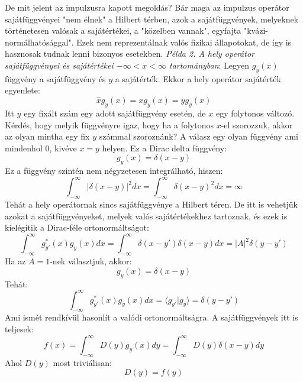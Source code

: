 \documentclass[../main.tex]{subfiles}
\begin{document}
De mit jelent az impulzusra kapott megoldás? Bár maga az impulzus operátor sajátfüggvényei "nem élnek" a Hilbert térben, azok a sajátfüggvények, melyeknek történetesen valósak a sajátértékei, 
a "közelben vannak", egyfajta "kvázi-normálhatósággal". Ezek nem reprezentálnak valós fizikai állapotokat, de így is hasznosak tudnak lenni bizonyos esetekben.
\newline
\newline
\textit{Példa 2. A hely operátor sajátfüggvényei és sajátértékei $-\infty < x < \infty$ tartományban}:
\newline
\newline
Legyen $g_{y}(x)$ függvény a sajátfüggvény és $y$ a sajátérték. Ekkor a hely operátor sajátérték egyenlete:
\begin{equation}
    \hat{x} g_{y}(x) = x g_{y}(x) = y g_{y}(x)
\end{equation}
Itt $y$ egy fixált szám egy adott sajátfüggvény esetén, de $x$ egy folytonos változó. Kérdés, hogy melyik függvényre igaz, hogy ha a folytonos $x$-el szorozzuk, akkor az olyan mintha egy fix $y$ számmal szoroznánk? 
A válasz egy olyan függvény ami mindenhol 0, kivéve $x = y$ helyen. Ez a Dirac delta függvény:
\begin{equation}
    g_{y}(x) = \delta(x - y)
\end{equation}
Ez a függvény szintén nem négyzetesen integrálható, hiszen:
\begin{equation}
    \int_{-\infty}^{\infty} |\delta(x - y)|^2 dx = \int_{-\infty}^{\infty} \delta(x - y)^2 dx = \infty
\end{equation}
Tehát a hely operátornak sincs sajátfüggvénye a Hilbert téren. De itt is vehetjük azokat a sajátfüggvényeket, melyek valós sajátértékekhez tartoznak, és ezek is kielégítik a Dirac-féle ortonormáltságot:
\begin{equation}
    \int_{-\infty}^{\infty} g_{y'}^*(x) g_{y}(x) dx = \int_{-\infty}^{\infty} \delta(x - y') \delta(x - y) dx = |A|^2 \delta(y - y')
\end{equation}
Ha az $A = 1$-nek választjuk, akkor:
\begin{equation}
    g_{y} (x) = \delta(x - y)
\end{equation}
Tehát:
\begin{equation}
    \int_{-\infty}^{\infty} g_{y'}^*(x) g_{y}(x) dx = \langle g_{y'} | g_{y} \rangle = \delta(y - y')
\end{equation}
Ami ismét rendkívül hasonlít a valódi ortonormáltságra. A sajátfüggvények itt is teljesek:
\begin{equation}
    f(x) = \int_{-\infty}^{\infty} D(y) g_{y}(x) dy = \int_{-\infty}^{\infty} D(y) \delta(x - y) dy
\end{equation}
Ahol $D(y)$ most triviálisan:
\begin{equation}
    D(y) = f(y)
\end{equation}
\end{document}
